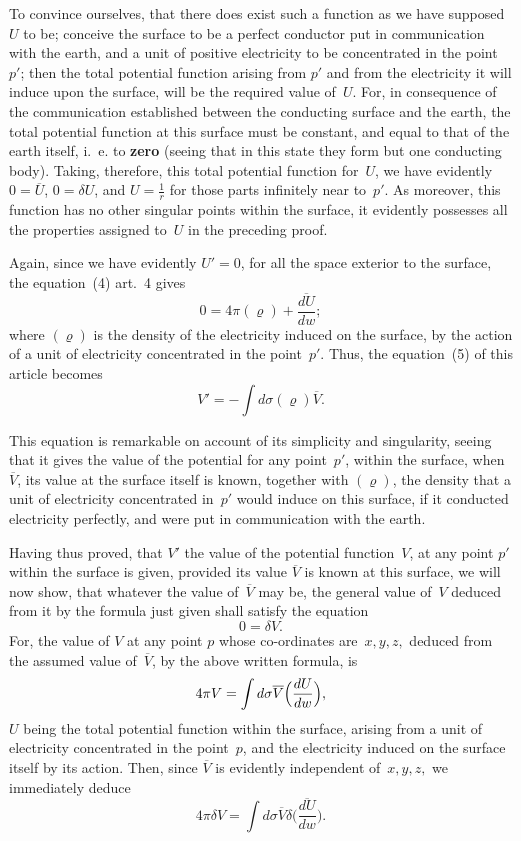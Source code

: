 \documentclass[11pt,notitlepage]{amsart}
\let\Emphasis\textbf
\renewcommand{\rho}{\varrho}
\begin{document}
To convince ourselves, that there does exist such a function as we
have supposed $U$ to be; conceive the surface to be a perfect conductor put
in communication with the earth, and a unit of positive electricity to be 
concentrated in the point $p'$;
then the total potential function arising from $p'$ and
from the electricity it will induce upon the surface, will be the required value
of~$U$. For, in consequence of the communication established between the
conducting surface and the earth, the total potential function at this surface
must be constant, and equal to that of the earth itself,
i.~e. to \Emphasis{zero} (seeing
that in this state they form but one conducting body). Taking, therefore,
this total potential function for~$U$,
we have evidently~$0=\overline{U}$, $0=\delta U$, and
$U=\frac1r$ for those parts infinitely near to~$p'$.
As moreover, this function has
no other singular points within the surface, it evidently possesses all the 
properties assigned to~$U$ in the preceding proof.

Again, since we have evidently $U'=0$, for all the space exterior
to the surface, the equation~(4) art.~4 gives
\[
0=4\pi(\rho)+\frac{\overline{dU}}{dw};
\]
where $(\rho)$ is the density
of the electricity induced on the surface, by the
action of a unit of electricity concentrated in the point~$p'$.
Thus, the equation~(5) of this article becomes
\[
\tag{6.}
V'=-\int d\sigma(\rho)\overline{V}.
\]

This equation is remarkable on account of its simplicity and singularity,
seeing that it gives the value of the potential for any point~$p'$, within the
surface, when $\overline{V}$, its value
at the surface itself is known, together with $(\rho)$,
the density that a unit of electricity concentrated in~$p'$ would induce on this
surface, if it conducted electricity perfectly, and were put in communication
with the earth.

Having thus proved, that $V'$ the value of the potential function~$V$, at
any point $p'$ within the surface is given,
provided its value $\overline{V}$ is known at
this surface, we will now show,
that whatever the value of~$\overline{V}$ may be, the
general value of~$V$ deduced from it by the formula just given shall satisfy
the equation
\[
0 = \delta V.
\]
For, the value of $V$ at any point $p$ whose co-ordinates are~$x,y,z,$ deduced
from the assumed value of~$\overline{V}$, by the above written formula, is
\[
4\pi V=\int d\sigma\overline{V}
\Bigl(\frac{dU}{dw}\Bigr),
\]
$U$ being the total potential function within the surface,
arising from a unit of
electricity concentrated in the point~$p$,
and the electricity induced on the surface
itself by its action.
Then, since $\overline{V}$ is evidently independent of~$x,y,z,$ we
immediately deduce
\[
4\pi\delta V=\int d\sigma\overline{V}\delta
\biggl(\frac{\overline{dU}}{dw}\biggr).
\]
\end{document}

